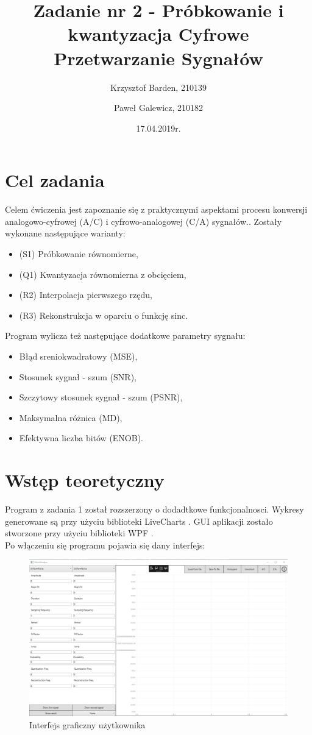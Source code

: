 \documentclass[12pt]{article}
\title{{\bf Zadanie nr 2 - Próbkowanie i kwantyzacja}\linebreak
Cyfrowe Przetwarzanie Sygnałów}
\author{Krzysztof Barden, 210139 \and Paweł Galewicz, 210182}
\date{17.04.2019r.}
\begin{document}
\clearpage\maketitle
\thispagestyle{empty}
\newpage
\setcounter{page}{1}
\section{Cel zadania}

Celem ćwiczenia jest zapoznanie się z praktycznymi aspektami procesu konwersji
analogowo-cyfrowej (A/C) i cyfrowo-analogowej (C/A) sygnałów.. Zostały wykonane następujące warianty:

\begin{itemize}
\item (S1) Próbkowanie równomierne,
\item (Q1) Kwantyzacja równomierna z obcięciem,
\item (R2) Interpolacja pierwszego rzędu,
\item (R3) Rekonstrukcja w oparciu o funkcję sinc.
\end{itemize}

Program wylicza też następujące dodatkowe parametry sygnału:
\begin{itemize}
\item Błąd sreniokwadratowy (MSE), 
\item Stosunek sygnał - szum (SNR), 
\item Szczytowy stosunek sygnał - szum (PSNR), 
\item Maksymalna różnica (MD), 
\item Efektywna liczba bitów (ENOB).
\end{itemize}

\section{Wstęp teoretyczny}

Program z zadania 1 został rozszerzony o dodadtkowe funkcjonalnosci. Wykresy generowane są przy użyciu biblioteki LiveCharts \cite{lv}. GUI aplikacji zostało stworzone przy użyciu biblioteki WPF \cite{wpf}.
\\Po włączeniu się programu pojawia się dany interfejs:
\begin{figure}[H]
 \centering
 \includegraphics[width=15cm]{images/gui1.PNG}
 \vspace{-0.3cm}
 \caption{Interfejs graficzny użytkownika}
 \label{gui}
\end{figure}
\end{document}
